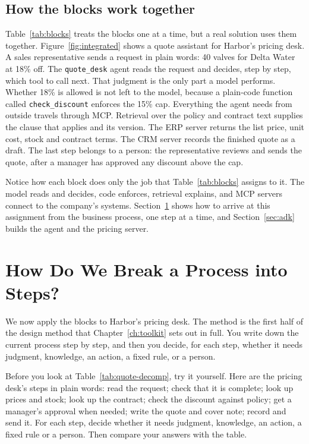 \subsection{How the blocks work together}
\label{sec:blocks-together}

Table~\ref{tab:blocks} treats the blocks one at a time, but a real solution uses them together. Figure~\ref{fig:integrated} shows a quote assistant for Harbor's pricing desk. A sales representative sends a request in plain words: 40 valves for Delta Water at 18\% off. The \texttt{quote\_desk} agent reads the request and decides, step by step, which tool to call next. That judgment is the only part a model performs. Whether 18\% is allowed is not left to the model, because a plain-code function called \texttt{check\_discount} enforces the 15\% cap. Everything the agent needs from outside travels through MCP. Retrieval over the policy and contract text supplies the clause that applies and its version. The ERP server returns the list price, unit cost, stock and contract terms. The CRM server records the finished quote as a draft. The last step belongs to a person: the representative reviews and sends the quote, after a manager has approved any discount above the cap.

Notice how each block does only the job that Table~\ref{tab:blocks} assigns to it. The model reads and decides, code enforces, retrieval explains, and MCP servers connect to the company's systems. Section~\ref{sec:decompose} shows how to arrive at this assignment from the business process, one step at a time, and Section~\ref{sec:adk} builds the agent and the pricing server.



\section{How Do We Break a Process into Steps?}
\label{sec:decompose}

We now apply the blocks to Harbor's pricing desk. The method is the first half of the design method that Chapter~\ref{ch:toolkit} sets out in full. You write down the current process step by step, and then you decide, for each step, whether it needs judgment, knowledge, an action, a fixed rule, or a person.

\begin{tryit}
Before you look at Table~\ref{tab:quote-decomp}, try it yourself. Here are the pricing desk's steps in plain words: read the request; check that it is complete; look up prices and stock; look up the contract; check the discount against policy; get a manager's approval when needed; write the quote and cover note; record and send it. For each step, decide whether it needs judgment, knowledge, an action, a fixed rule or a person. Then compare your answers with the table.
\end{tryit}

